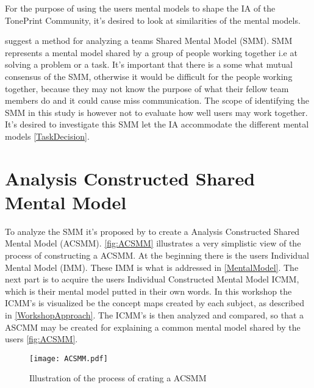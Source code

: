 \noindent
For the purpose of using the users mental models to shape the IA of the TonePrint Community, it's desired to look at similarities of the mental models.

\textcite{WEB:ConceptMapAnalysis} suggest a method for analyzing a teams Shared Mental Model (SMM). SMM represents a mental model shared by a group of people working together i.e  at solving a problem or a task. It's important that there is a some what mutual consensus of the SMM, otherwise it would be difficult for the people working together, because they may not know the purpose of what their fellow team members do and it could cause miss communication. The scope of identifying the SMM in this study is however not to evaluate how well users may work together. It's desired to investigate this SMM let the IA accommodate the different mental models \autoref{TaskDecision}.


\section{Analysis Constructed Shared Mental Model}
\label{ACSMM}
To analyze the SMM it's proposed by \textcite{WEB:ConceptMapAnalysis} to create a Analysis Constructed Shared Mental Model (ACSMM). \autoref{fig:ACSMM} illustrates a very simplistic view of the process of constructing a ACSMM. At the beginning there is the users Individual Mental Model (IMM). These IMM is what is addressed in \autoref{MentalModel}. The next part is to acquire the users Individual Constructed Mental Model ICMM, which is their mental model putted in their own words. In this workshop the ICMM's is visualized be the concept maps created by each subject, as described in \autoref{WorkshopApproach}. The ICMM's is then analyzed and compared, so that a ASCMM may be created for explaining a common mental model shared by the users \autoref{fig:ACSMM}.  

\begin{figure}[H]
	\centering
	\texttt{[image: ACSMM.pdf]}
	\caption{Illustration of the process of crating a ACSMM}
	\label{fig:ACSMM}
\end{figure}

